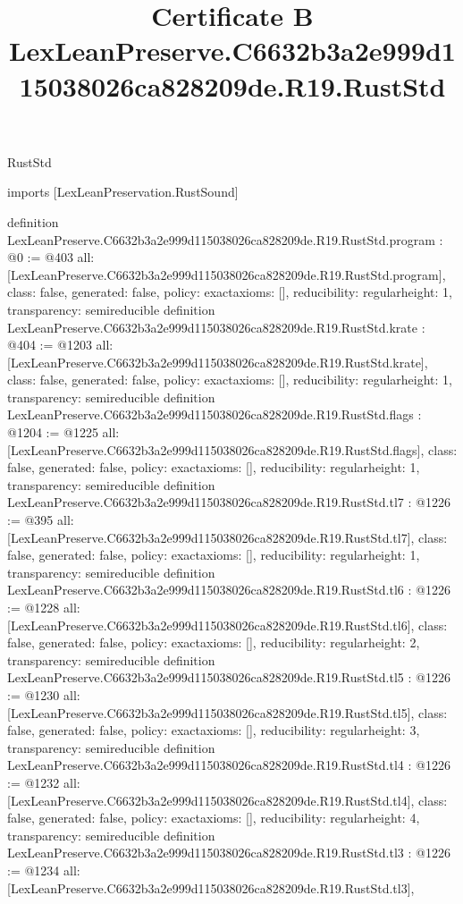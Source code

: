 \begin{lexlean}{RustStd}
\title{Certificate B LexLeanPreserve.C6632b3a2e999d115038026ca828209de.R19.RustStd}
\begin{coremodule}
imports [LexLeanPreservation.RustSound]

definition LexLeanPreserve.C6632b3a2e999d115038026ca828209de.R19.RustStd.program : @0 := @403 {
  all: [LexLeanPreserve.C6632b3a2e999d115038026ca828209de.R19.RustStd.program],
  class: false,
  generated: false,
  policy: exact{axioms: []},
  reducibility: regular{height: 1},
  transparency: semireducible
}
definition LexLeanPreserve.C6632b3a2e999d115038026ca828209de.R19.RustStd.krate : @404 := @1203 {
  all: [LexLeanPreserve.C6632b3a2e999d115038026ca828209de.R19.RustStd.krate],
  class: false,
  generated: false,
  policy: exact{axioms: []},
  reducibility: regular{height: 1},
  transparency: semireducible
}
definition LexLeanPreserve.C6632b3a2e999d115038026ca828209de.R19.RustStd.flags : @1204 := @1225 {
  all: [LexLeanPreserve.C6632b3a2e999d115038026ca828209de.R19.RustStd.flags],
  class: false,
  generated: false,
  policy: exact{axioms: []},
  reducibility: regular{height: 1},
  transparency: semireducible
}
definition LexLeanPreserve.C6632b3a2e999d115038026ca828209de.R19.RustStd.tl7 : @1226 := @395 {
  all: [LexLeanPreserve.C6632b3a2e999d115038026ca828209de.R19.RustStd.tl7],
  class: false,
  generated: false,
  policy: exact{axioms: []},
  reducibility: regular{height: 1},
  transparency: semireducible
}
definition LexLeanPreserve.C6632b3a2e999d115038026ca828209de.R19.RustStd.tl6 : @1226 := @1228 {
  all: [LexLeanPreserve.C6632b3a2e999d115038026ca828209de.R19.RustStd.tl6],
  class: false,
  generated: false,
  policy: exact{axioms: []},
  reducibility: regular{height: 2},
  transparency: semireducible
}
definition LexLeanPreserve.C6632b3a2e999d115038026ca828209de.R19.RustStd.tl5 : @1226 := @1230 {
  all: [LexLeanPreserve.C6632b3a2e999d115038026ca828209de.R19.RustStd.tl5],
  class: false,
  generated: false,
  policy: exact{axioms: []},
  reducibility: regular{height: 3},
  transparency: semireducible
}
definition LexLeanPreserve.C6632b3a2e999d115038026ca828209de.R19.RustStd.tl4 : @1226 := @1232 {
  all: [LexLeanPreserve.C6632b3a2e999d115038026ca828209de.R19.RustStd.tl4],
  class: false,
  generated: false,
  policy: exact{axioms: []},
  reducibility: regular{height: 4},
  transparency: semireducible
}
definition LexLeanPreserve.C6632b3a2e999d115038026ca828209de.R19.RustStd.tl3 : @1226 := @1234 {
  all: [LexLeanPreserve.C6632b3a2e999d115038026ca828209de.R19.RustStd.tl3],
}
\end{coremodule}
\end{lexlean}
